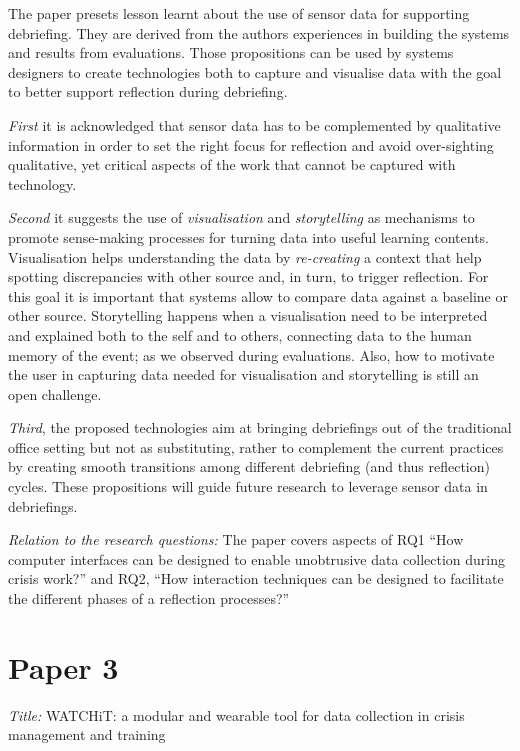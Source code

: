 The paper presets lesson learnt about the use of sensor data for supporting debriefing. They are derived from the authors experiences in building the systems and results from evaluations. Those propositions can be used by systems designers to create technologies both to capture and visualise data with the goal to better support reflection during debriefing.

\emph{First} it is acknowledged that sensor data has to be complemented by qualitative information in order to set the right focus for reflection and avoid over-sighting qualitative, yet critical aspects of the work that cannot be captured with technology.

\emph{Second} it suggests the use of \emph{visualisation} and \emph{storytelling} as mechanisms to promote sense-making processes for turning data into useful learning contents. Visualisation helps understanding the data by \emph{re-creating} a context that help spotting discrepancies with other source and, in turn, to trigger reflection. For this goal it is important that systems allow to compare data against a baseline or other source. Storytelling happens when a visualisation need to be interpreted and explained both to the self and to others, connecting data to the human memory of the event; as we observed during evaluations. Also, how to motivate the user in capturing data needed for visualisation and storytelling is still an open challenge.

\emph{Third}, the proposed technologies aim at bringing debriefings out of the traditional office setting but not as substituting, rather to complement the current practices by creating smooth transitions among different debriefing (and thus reflection) cycles. These propositions will guide future research to leverage sensor data in debriefings.

\emph{Relation to the research questions:} The paper covers aspects of RQ1 ``How computer interfaces can be designed to enable unobtrusive data collection during crisis work?'' and RQ2, ``How interaction techniques can be designed to facilitate the different phases of a reflection processes?''

\section[WATCHiT: a modular and wearable tool for data collection in crisis management and training]{Paper 3}\label{paper-3}

\emph{Title:} WATCHiT: a modular and wearable tool for data collection in crisis management and training

